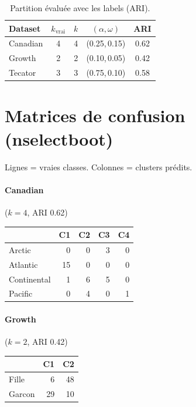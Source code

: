\documentclass[11pt, a4paper]{article}
\begin{document}
\begin{table}[H]
\centering
\renewcommand{\arraystretch}{1.3}
\small
\begin{tabular}{lcccc}
\toprule
\textbf{Dataset} & $k_{\mathrm{vrai}}$ & $k$ & $(\alpha,\omega)$ & ARI \\
\midrule
Canadian & 4 & 4 & (0.25,\,0.15) & 0.62 \\
Growth   & 2 & 2 & (0.10,\,0.05) & 0.42 \\
Tecator  & 3 & 3 & (0.75,\,0.10) & 0.58 \\
\bottomrule
\end{tabular}
\caption{Partition évaluée avec les labels (ARI).}
\label{tab:nselectboot}
\end{table}

\section{Matrices de confusion (nselectboot)}

Lignes = vraies classes. Colonnes = clusters prédits.

\paragraph{Canadian} ($k=4$, ARI 0.62)
\begin{center}
\small
\begin{tabular}{lrrrr}
\toprule
& C1 & C2 & C3 & C4 \\
\midrule
Arctic & 0 & 0 & 3 & 0 \\
Atlantic & 15 & 0 & 0 & 0 \\
Continental & 1 & 6 & 5 & 0 \\
Pacific & 0 & 4 & 0 & 1 \\
\bottomrule
\end{tabular}
\end{center}

\paragraph{Growth} ($k=2$, ARI 0.42)
\begin{center}
\small
\begin{tabular}{lrr}
\toprule
& C1 & C2 \\
\midrule
Fille & 6 & 48 \\
Garcon & 29 & 10 \\
\bottomrule
\end{tabular}
\end{center}
\end{document}
